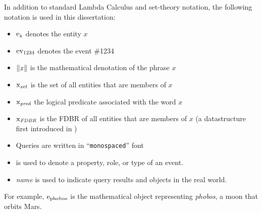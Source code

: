 \documentclass[../main.tex]{subfiles}
\begin{document}
\begin{refsection}
In addition to standard Lambda Calculus and set-theory notation, the following notation is used in this dissertation:
\begin{itemize}
    \item $\mathrm{e}_{\operatorname{x}}$ denotes the entity $x$
    \item $\operatorname{ev}_{1234}$ denotes the event \#1234
    \item $\lVert\textit{x\hspace{0.1em}}\rVert$ is the mathematical denotation of the phrase $x$
    \item $\operatorname{x}_{\operatorname{\mathit{set}}}$ is the set of all entities that are members of $x$
    \item $\operatorname{x}_{\operatorname{\mathit{pred}}}$ the logical predicate associated with the word $x$
    \item $\operatorname{x}_{\operatorname{\mathit{FDBR}}}$ is the FDBR of all entities that are members of $x$ (a datastructure first introduced in )
    \item Queries are written in ``\texttt{monospaced}'' font
    \item {} is used to denote a property, role, or type of an event.
    \item \textit{name} is used to indicate query results and objects in the real world.
\end{itemize}
For example, $\mathrm{e}_{\operatorname{phobos}}$ is the mathematical object representing \textit{phobos}, a moon that orbits Mars.


\printbibliography[heading=subbibintoc]
\end{refsection}
\end{document}
